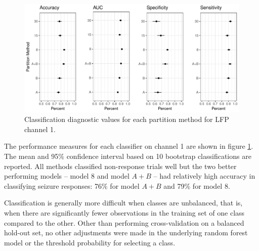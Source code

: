 \begin{figure}[!htbp]
  \begin{center}
  \includegraphics[width = \textwidth, keepaspectratio]{./figs/eeg-partition-diagnostic.pdf}
  \end{center}
  \caption{Classification diagnostic values for each partition method for LFP channel 1.}
  \label{fig:eeg-diagnostic} 
\end{figure}

The performance measures for each classifier on channel 
1 are shown in figure \ref{fig:eeg-diagnostic}. The 
mean and 95\% confidence interval based on 10 
bootstrap classifications are reported.  All methods classified 
non-response trials well but the two better performing
 models -- model 8  and model $A+B$ -- 
had relatively high accuracy in classifying seizure responses: 76\% for model $A+B$ and 79\% for model 8. 

Classification is generally more difficult 
when classes are unbalanced, that is, when there are 
significantly fewer observations in the training 
set of one class compared to the other. Other 
than performing cross-validation on a balanced 
hold-out set, no other adjustments were made in 
the underlying random forest model or the 
threshold probability for selecting a class.  

